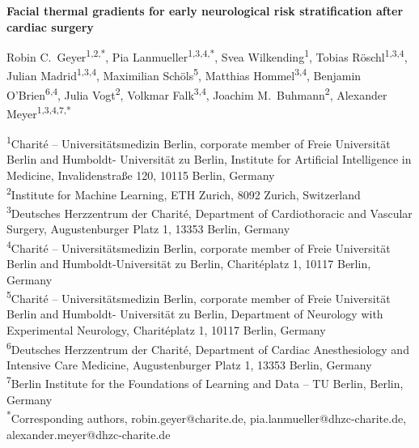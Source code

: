 \documentclass[11pt]{article}
\begin{document}
{\bfseries\Large Facial thermal gradients for early neurological risk stratification after cardiac surgery}

\bigskip

Robin C.~Geyer\textsuperscript{1,2,*},
Pia Lanmueller\textsuperscript{1,3,4,*},
Svea Wilkending\textsuperscript{1},
Tobias R\"{o}schl\textsuperscript{1,3,4},
Julian Madrid\textsuperscript{1,3,4},
Maximilian Sch\"{o}ls\textsuperscript{5},
Matthias Hommel\textsuperscript{3,4},
Benjamin O'Brien\textsuperscript{6,4},
Julia Vogt\textsuperscript{2},
Volkmar Falk\textsuperscript{3,4},
Joachim M.~Buhmann\textsuperscript{2},
Alexander Meyer\textsuperscript{1,3,4,7,*}

\bigskip

\textsuperscript{1}Charité -- Universitätsmedizin Berlin, corporate member of Freie Universität Berlin and Humboldt-
Universität zu Berlin, Institute for Artificial Intelligence in Medicine, Invalidenstraße 120, 10115 Berlin, Germany\\
\textsuperscript{2}Institute for Machine Learning, ETH Zurich, 8092 Zurich, Switzerland\\
\textsuperscript{3}Deutsches Herzzentrum der Charité, Department of Cardiothoracic and Vascular Surgery, Augustenburger Platz 1, 13353 Berlin, Germany\\
\textsuperscript{4}Charité -- Universitätsmedizin Berlin, corporate member of Freie Universität Berlin and Humboldt-Universität zu Berlin, Charitéplatz 1, 10117 Berlin, Germany\\
\textsuperscript{5}Charité -- Universitätsmedizin Berlin, corporate member of Freie Universität Berlin and Humboldt-
Universität zu Berlin, Department of Neurology with Experimental Neurology, Charit\'{e}platz 1, 10117 Berlin, Germany\\
\textsuperscript{6}Deutsches Herzzentrum der Charité, Department of Cardiac Anesthesiology and Intensive Care Medicine, Augustenburger Platz 1, 13353 Berlin, Germany\\
\textsuperscript{7}Berlin Institute for the Foundations of Learning and Data -- TU Berlin, Berlin, Germany \\

\textsuperscript{*}Corresponding authors, robin.geyer@charite.de, pia.lanmueller@dhzc-charite.de,\\
alexander.meyer@dhzc-charite.de

\bigskip
\end{document}
